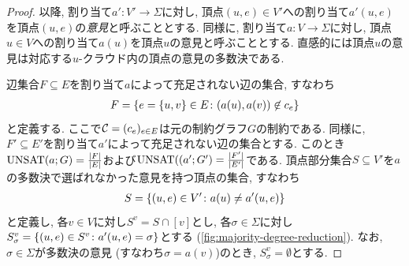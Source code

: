 \begin{proof}
以降, 割り当て$a'\colon V'\to\Sigma$に対し, 頂点$(u,e)\in V'$への割り当て$a'(u,e)$を頂点$(u,e)$の\emph{意見}と呼ぶこととする.
同様に, 割り当て$a\colon V\to\Sigma$に対し, 頂点$u\in V$への割り当て$a(u)$を頂点$u$の意見と呼ぶこととする.
直感的には頂点$u$の意見は対応する$u$-クラウド内の頂点の意見の多数決である.


辺集合$F\subseteq E$を割り当て$a$によって充足されない辺の集合, すなわち
\begin{align*}
  F = \qty{ e=\{u,v\}\in E \colon (a(u),a(v)) \not\in c_e}
\end{align*}
と定義する.
ここで$\mathcal{C} = (c_e)_{e\in E}$は元の制約グラフ$G$の制約である.
同様に, $F'\subseteq E'$を割り当て$a'$によって充足されない辺の集合とする.
このとき$\mathrm{UNSAT}(a;G) = \frac{|F|}{|E|}$および$\mathrm{UNSAT}((a';G') = \frac{|F'|}{|E'|}$である.
頂点部分集合$S\subseteq V'$を$a$の多数決で選ばれなかった意見を持つ頂点の集合, すなわち
\begin{align*}
  S = \qty{ (u,e) \in V' \colon a(u) \ne a'(u,e)}
\end{align*}
と定義し, 各$v\in V$に対し$S^v = S\cap [v]$とし, 各$\sigma\in \Sigma$に対し$S^v_\sigma = \qty{ (u,e)\in S^v \colon a'(u,e)=\sigma }$とする (\cref{fig:majority-degree-reduction}).
なお, $\sigma\in\Sigma$が多数決の意見 (すなわち$\sigma=a(v)$)のとき, $S^v_\sigma=\emptyset$とする.


\end{proof}
